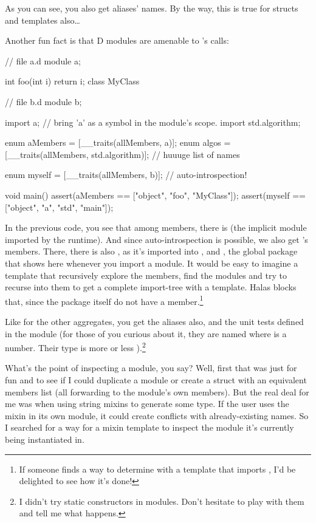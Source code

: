 As you can see, you also get aliases' names. By the way, this is true for structs and templates also\ldots

Another fun fact is that D modules are amenable to 's calls:

\begin{dcode}
// file a.d
module a;

int foo(int i) { return i;}
class MyClass { }
\end{dcode}
\begin{dcode}
// file b.d
module b;

import a; // bring 'a' as a symbol in the module's scope.
import std.algorithm;

enum aMembers = [__traits(allMembers, a)];
enum algos = [__traits(allMembers, std.algorithm)]; // huuuge list of names

enum myself = [__traits(allMembers, b)]; // auto-introspection!

void main()
{
    assert(aMembers == ["object", "foo", "MyClass"]);
    assert(myself   == ["object", "a", "std", "main"]);
}
\end{dcode}

In the previous code, you see that among  members, there is  (the implicit  module imported by the runtime). And since auto-introspection is possible, we also get 's members. There, there is also , as it's imported into , and , the global package that shows here whenever you import a  module. It would be easy to imagine a template that recursively explore the members, find the modules and try to recurse into them to get a complete import-tree with a template. Halas  blocks that, since the package itself do not have a member.\footnote{ If someone finds a way to determine with a template that  imports , I'd be delighted to see how it's done!}

Like for the other aggregates, you get the aliases also, and the unit tests defined in the module (for those of you curious about it, they are named  where  is a number. Their type is more or less \DD{()}).\footnote{ I didn't try static constructors in modules. Don't hesitate to play with them and tell me what happens.}

What's the point of inspecting a module, you say? Well, first that was just for fun and to see if I could duplicate a module or create a struct with an equivalent members list (all forwarding to the module's own members). But the real deal for me was when using string mixins to generate some type. If the user uses the mixin in its own module, it could create conflicts with already-existing names. So I searched for a way for a mixin template to inspect the module it's currently being instantiated in. 

